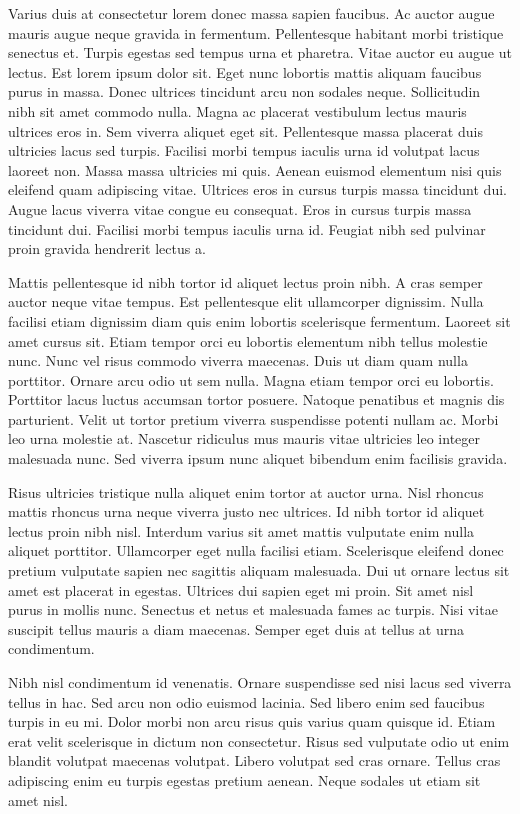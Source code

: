 \documentclass[
]{scrbook}
\begin{document}
Varius duis at consectetur lorem donec massa sapien faucibus. Ac auctor augue mauris augue neque gravida in fermentum. Pellentesque habitant morbi tristique senectus et. Turpis egestas sed tempus urna et pharetra. Vitae auctor eu augue ut lectus. Est lorem ipsum dolor sit. Eget nunc lobortis mattis aliquam faucibus purus in massa. Donec ultrices tincidunt arcu non sodales neque. Sollicitudin nibh sit amet commodo nulla. Magna ac placerat vestibulum lectus mauris ultrices eros in. Sem viverra aliquet eget sit. Pellentesque massa placerat duis ultricies lacus sed turpis. Facilisi morbi tempus iaculis urna id volutpat lacus laoreet non. Massa massa ultricies mi quis. Aenean euismod elementum nisi quis eleifend quam adipiscing vitae. Ultrices eros in cursus turpis massa tincidunt dui. Augue lacus viverra vitae congue eu consequat. Eros in cursus turpis massa tincidunt dui. Facilisi morbi tempus iaculis urna id. Feugiat nibh sed pulvinar proin gravida hendrerit lectus a.

Mattis pellentesque id nibh tortor id aliquet lectus proin nibh. A cras semper auctor neque vitae tempus. Est pellentesque elit ullamcorper dignissim. Nulla facilisi etiam dignissim diam quis enim lobortis scelerisque fermentum. Laoreet sit amet cursus sit. Etiam tempor orci eu lobortis elementum nibh tellus molestie nunc. Nunc vel risus commodo viverra maecenas. Duis ut diam quam nulla porttitor. Ornare arcu odio ut sem nulla. Magna etiam tempor orci eu lobortis. Porttitor lacus luctus accumsan tortor posuere. Natoque penatibus et magnis dis parturient. Velit ut tortor pretium viverra suspendisse potenti nullam ac. Morbi leo urna molestie at. Nascetur ridiculus mus mauris vitae ultricies leo integer malesuada nunc. Sed viverra ipsum nunc aliquet bibendum enim facilisis gravida.

Risus ultricies tristique nulla aliquet enim tortor at auctor urna. Nisl rhoncus mattis rhoncus urna neque viverra justo nec ultrices. Id nibh tortor id aliquet lectus proin nibh nisl. Interdum varius sit amet mattis vulputate enim nulla aliquet porttitor. Ullamcorper eget nulla facilisi etiam. Scelerisque eleifend donec pretium vulputate sapien nec sagittis aliquam malesuada. Dui ut ornare lectus sit amet est placerat in egestas. Ultrices dui sapien eget mi proin. Sit amet nisl purus in mollis nunc. Senectus et netus et malesuada fames ac turpis. Nisi vitae suscipit tellus mauris a diam maecenas. Semper eget duis at tellus at urna condimentum.

Nibh nisl condimentum id venenatis. Ornare suspendisse sed nisi lacus sed viverra tellus in hac. Sed arcu non odio euismod lacinia. Sed libero enim sed faucibus turpis in eu mi. Dolor morbi non arcu risus quis varius quam quisque id. Etiam erat velit scelerisque in dictum non consectetur. Risus sed vulputate odio ut enim blandit volutpat maecenas volutpat. Libero volutpat sed cras ornare. Tellus cras adipiscing enim eu turpis egestas pretium aenean. Neque sodales ut etiam sit amet nisl.
\end{document}
